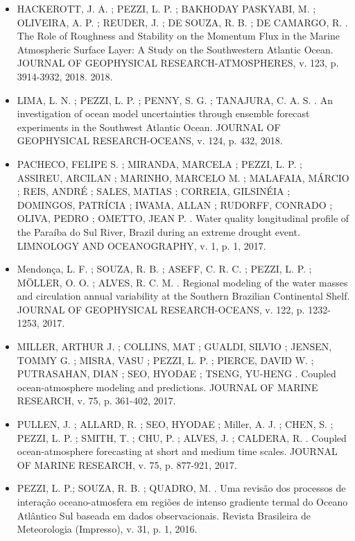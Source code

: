 \documentclass[11pt, a4paper]{awesome-cv}
\begin{document}
\begin{cvletter}
\begin{itemize}
  \item[] HACKEROTT, J. A. ; PEZZI, L. P. ; BAKHODAY PASKYABI, M. ; OLIVEIRA, A. P. ; REUDER, J. ; 
  DE SOUZA, R. B. ; DE CAMARGO, R. . The Role of Roughness and Stability on the Momentum Flux in 
  the Marine Atmospheric Surface Layer: A Study on the Southwestern Atlantic Ocean. JOURNAL OF 
  GEOPHYSICAL RESEARCH-ATMOSPHERES, v. 123, p. 3914-3932, 2018. 
  2018.

  \item[] LIMA, L. N. ; PEZZI, L. P. ; PENNY, S. G. ; TANAJURA, C. A. S. . An investigation of ocean 
  model uncertainties through ensemble forecast experiments in the Southwest Atlantic Ocean. 
  JOURNAL OF GEOPHYSICAL RESEARCH-OCEANS, v. 124, p. 432,
  2018.

  \item[] PACHECO, FELIPE S. ; MIRANDA, MARCELA ; PEZZI, L. P. ; ASSIREU, ARCILAN ; MARINHO, 
  MARCELO M. ; MALAFAIA, MÁRCIO ; REIS, ANDRÉ ; SALES, MATIAS ; CORREIA, GILSINÉIA ; DOMINGOS, 
  PATRÍCIA ; IWAMA, ALLAN ; RUDORFF, CONRADO ; OLIVA, PEDRO ; OMETTO, JEAN P. . Water quality 
  longitudinal profile of the Paraíba do Sul River, Brazil during an extreme drought event. 
  LIMNOLOGY AND OCEANOGRAPHY, v. 1, p. 1,
  2017.

  \item[] Mendonça, L. F. ; SOUZA, R. B. ; ASEFF, C. R. C. ; PEZZI, L. P. ; MÖLLER, O. O. ; 
  ALVES, R. C. M. . Regional modeling of the water masses and circulation annual variability 
  at the Southern Brazilian Continental Shelf. JOURNAL OF GEOPHYSICAL RESEARCH-OCEANS, v. 
  122, p. 1232-1253,
  2017.

  \item[] MILLER, ARTHUR J. ; COLLINS, MAT ; GUALDI, SILVIO ; JENSEN, TOMMY G. ; MISRA, VASU ; PEZZI, 
  L. P. ; PIERCE, DAVID W. ; PUTRASAHAN, DIAN ; SEO, HYODAE ; TSENG, YU-HENG . 
  Coupled ocean-atmosphere modeling and predictions. JOURNAL OF MARINE RESEARCH, v. 75, p. 
  361-402,
  2017.

  \item[] PULLEN, J. ; ALLARD, R. ; SEO, HYODAE ; Miller, A. J. ; CHEN, S. ; PEZZI, L. P. ; SMITH, T. ; 
  CHU, P. ; ALVES, J. ; CALDERA, R. . Coupled ocean-atmosphere forecasting at short and medium time 
  scales. JOURNAL OF MARINE RESEARCH, v. 75, p. 877-921,
  2017.

  \item[] PEZZI, L. P.; SOUZA, R. B. ; QUADRO, M. . Uma revisão dos processos de interação 
  oceano-atmosfera em regiões de intenso gradiente termal do Oceano Atlântico Sul baseada em dados 
  observacionais. Revista Brasileira de Meteorologia (Impresso), v. 31, p. 1,
  2016.


\end{itemize}
\end{cvletter}
\end{document}

